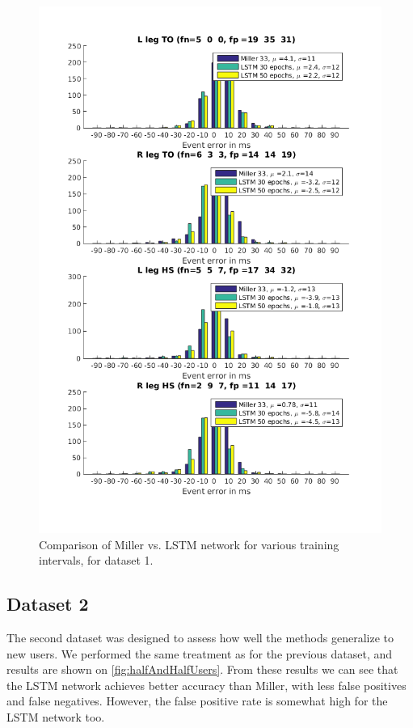 \documentclass{acm_proc_article-sp}
\begin{document}
\begin{figure}[H]
 \centering
 \includegraphics[scale=.5]{./figures/Test1_1Train1_2Compare.png}
 \caption{Comparison of Miller vs. LSTM network for various training intervals, for dataset 1.}
 \label{fig:halfAndHalfTrials}
\end{figure}

\subsection{Dataset 2}
The second dataset was designed to assess how well the methods generalize to new users. We performed the same treatment as for the previous dataset, and results are shown on \ref{fig:halfAndHalfUsers}. From these results we can see that the LSTM network achieves better accuracy than Miller, with less false positives and false negatives. However, the false positive rate is somewhat high for the LSTM network too. 
\end{document}
